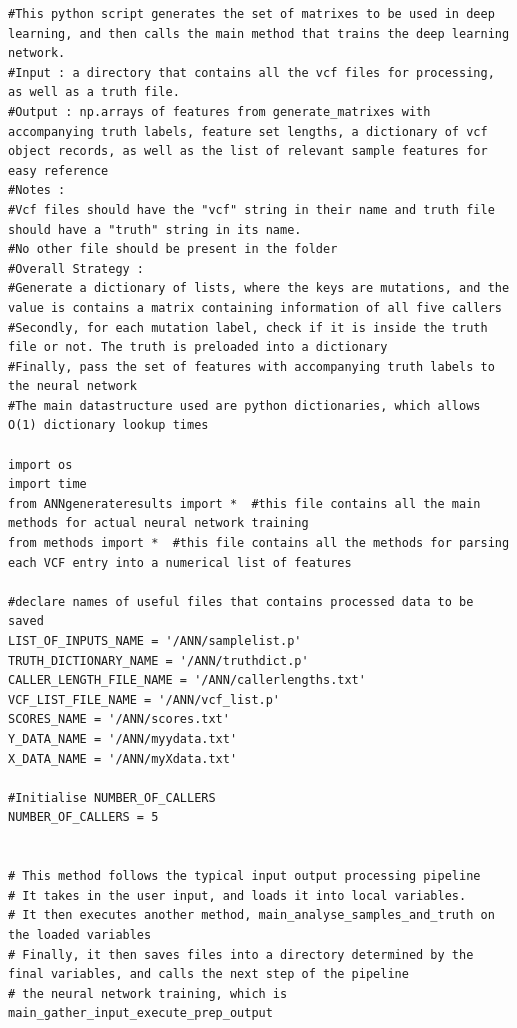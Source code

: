 \documentclass{article}
\begin{document}
\begin{verbatim}
#This python script generates the set of matrixes to be used in deep learning, and then calls the main method that trains the deep learning network.
#Input : a directory that contains all the vcf files for processing, as well as a truth file. 
#Output : np.arrays of features from generate_matrixes with accompanying truth labels, feature set lengths, a dictionary of vcf object records, as well as the list of relevant sample features for easy reference
#Notes :
#Vcf files should have the "vcf" string in their name and truth file should have a "truth" string in its name.
#No other file should be present in the folder
#Overall Strategy :
#Generate a dictionary of lists, where the keys are mutations, and the value is contains a matrix containing information of all five callers
#Secondly, for each mutation label, check if it is inside the truth file or not. The truth is preloaded into a dictionary
#Finally, pass the set of features with accompanying truth labels to the neural network 
#The main datastructure used are python dictionaries, which allows O(1) dictionary lookup times 

import os  
import time
from ANNgenerateresults import *  #this file contains all the main methods for actual neural network training
from methods import *  #this file contains all the methods for parsing each VCF entry into a numerical list of features

#declare names of useful files that contains processed data to be saved
LIST_OF_INPUTS_NAME = '/ANN/samplelist.p'     
TRUTH_DICTIONARY_NAME = '/ANN/truthdict.p'
CALLER_LENGTH_FILE_NAME = '/ANN/callerlengths.txt'
VCF_LIST_FILE_NAME = '/ANN/vcf_list.p'
SCORES_NAME = '/ANN/scores.txt'
Y_DATA_NAME = '/ANN/myydata.txt'
X_DATA_NAME = '/ANN/myXdata.txt'

#Initialise NUMBER_OF_CALLERS
NUMBER_OF_CALLERS = 5


# This method follows the typical input output processing pipeline 
# It takes in the user input, and loads it into local variables. 
# It then executes another method, main_analyse_samples_and_truth on the loaded variables
# Finally, it then saves files into a directory determined by the final variables, and calls the next step of the pipeline
# the neural network training, which is main_gather_input_execute_prep_output


\end{verbatim}
\end{document}
